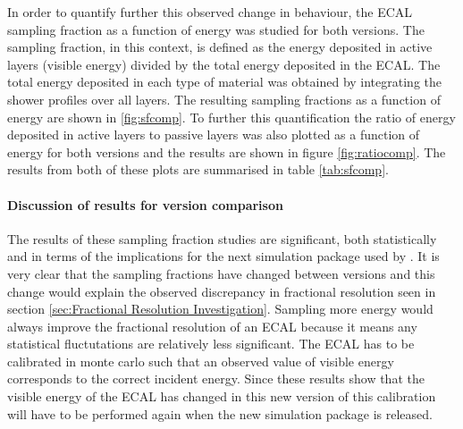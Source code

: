 In order to quantify further this observed change in behaviour, the ECAL sampling fraction as a function of energy was studied for both \geant versions.  The sampling fraction, in this context, is defined as the energy deposited in active layers (visible energy) divided by the total energy deposited in the ECAL.  The total energy deposited in each type of material was obtained by integrating the shower profiles over all layers.  The resulting sampling fractions as a function of energy are shown in \ref{fig:sfcomp}. To further this quantification the ratio of energy deposited in active layers to passive layers was also plotted as a function of energy for both \geant versions and the results are shown in figure \ref{fig:ratiocomp}.  The results from both of these plots are summarised in table \ref{tab:sfcomp}.

\paragraph{Discussion of results for \geant version comparison}
\label{sec:Discussionofresultsone}
The results of these sampling fraction studies are significant, both statistically and in terms of the implications for the next simulation package used by \lhcb.  It is very clear that the sampling fractions have changed between \geant versions and this change would explain the observed discrepancy in fractional resolution seen in section \ref{sec:Fractional Resolution Investigation}.  Sampling more energy would always improve the fractional resolution of an ECAL because it means any statistical fluctutations are relatively less significant. The ECAL has to be calibrated in monte carlo such that an observed value of visible energy corresponds to the correct incident energy.  Since these results show that the visible energy of the ECAL has changed in this new version of \geant this calibration will have to be performed again when the new simulation package is released.

